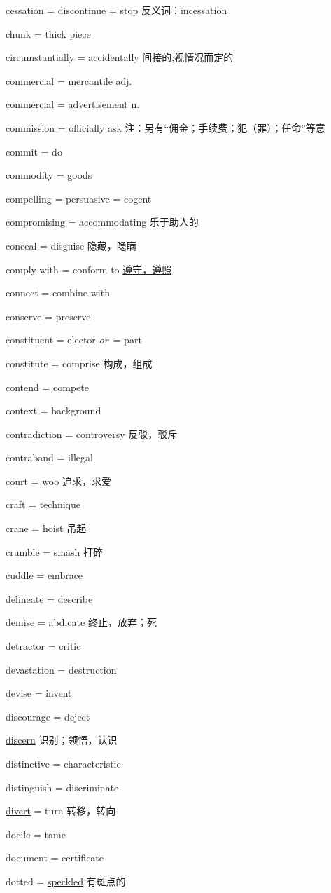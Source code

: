 \documentclass[UTF8, fontset = none, zihao = -4, linespread = 1.1]{ctexart}
\renewcommand{\o}{\textit{or}\ }
\begin{document}
\begin{multicols}{2}
cessation = discontinue = stop 反义词：incessation

chunk = thick piece

circumstantially = accidentally 间接的;视情况而定的

commercial = mercantile adj.

commercial = advertisement n.

commission = officially ask 注：另有“佣金；手续费；犯（罪）；任命”等意

commit = do

commodity = goods

compelling = persuasive = cogent

compromising = accommodating 乐于助人的

conceal = disguise 隐藏，隐瞒

comply with = conform to \underline{遵守，遵照}

connect = combine with

conserve = preserve

constituent = elector \o = part

constitute = comprise 构成，组成

contend = compete

context = background

contradiction = controversy 反驳，驳斥

contraband = illegal

court = woo 追求，求爱

craft = technique

crane = hoist 吊起

crumble = smash 打碎

cuddle = embrace

delineate = describe

demise = abdicate 终止，放弃；死

detractor = critic

devastation = destruction

devise = invent

discourage = deject

\underline{discern} 识别；领悟，认识

distinctive = characteristic

distinguish = discriminate

\underline{divert} = turn 转移，转向

docile = tame

document = certificate

dotted = \underline{speckled} 有斑点的


\end{multicols}
\end{document}
